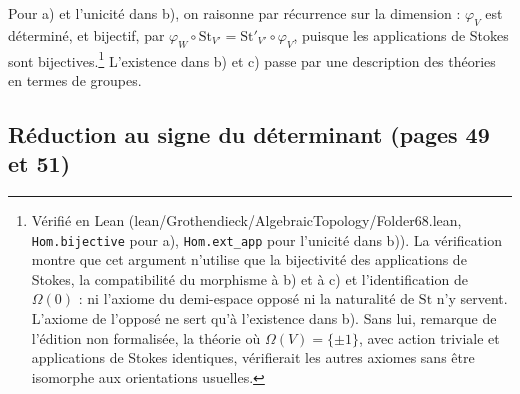 \documentclass[11pt,a4paper]{article}
\begin{document}
Pour a) et l'unicité dans b), on raisonne par récurrence sur la dimension :
$\varphi_V$ est déterminé, et bijectif, par
$\varphi_W \circ \mathrm{St}_{V'} = \mathrm{St}'_{V'} \circ \varphi_V$,
puisque les applications de Stokes sont bijectives.\footnote{Vérifié en Lean
(lean/Grothendieck/AlgebraicTopology/Folder68.lean, \texttt{Hom.bijective} pour a),
\texttt{Hom.ext\_app} pour l'unicité dans b)). La vérification montre que
cet argument n'utilise que la bijectivité des applications de Stokes, la
compatibilité du morphisme à b) et à c) et l'identification de
$\Omega(0)$ : ni l'axiome du demi-espace opposé ni la naturalité de
$\mathrm{St}$ n'y servent. L'axiome de l'opposé ne sert qu'à l'existence
dans b). Sans lui, remarque de l'édition non formalisée, la théorie où
$\Omega(V) = \{\pm 1\}$, avec action triviale et applications de Stokes
identiques, vérifierait les autres axiomes sans être isomorphe aux
orientations usuelles.} L'existence dans b) et c)
passe par une description des théories en termes de groupes.

\subsection*{Réduction au signe du déterminant (pages 49 et 51)}
\end{document}

